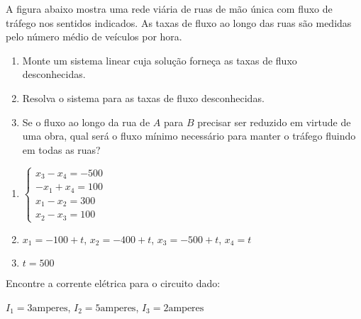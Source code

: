 \documentclass[12pt]{exam}
\begin{document}
\begin{exercicio}
  A figura abaixo mostra uma rede viária de ruas de mão única com fluxo de tráfego nos sentidos indicados. As taxas
  de fluxo ao longo das ruas são medidas pelo número médio de veículos por hora.
  
  

  \begin{enumerate}
    \item Monte um sistema linear cuja solução forneça as taxas de fluxo desconhecidas.
    \item Resolva o sistema para as taxas de fluxo desconhecidas.
    \item Se o fluxo ao longo da rua de $A$ para $B$ precisar ser reduzido em virtude de uma obra, qual será o fluxo mínimo necessário
      para manter o tráfego fluindo em todas as ruas?
  \end{enumerate}
  \begin{solucao}
    \begin{enumerate}
      \item $\begin{cases}x_3 - x_4 = -500\\-x_1 + x_4 = 100\\x_1 - x_2 = 300\\x_2 - x_3 = 100\end{cases}$
      \item $x_1 = -100 +t$, $x_2 = -400 + t$, $x_3 = -500 + t$, $x_4 = t$
      \item $t = 500$
    \end{enumerate}
  \end{solucao}
\end{exercicio}

\begin{exercicio}
  Encontre a corrente elétrica para o circuito dado:
  
  \begin{solucao}
    $I_1 = 3 \mbox{amperes}$,
    $I_2 = 5 \mbox{amperes}$,
    $I_3 = 2 \mbox{amperes}$
  \end{solucao}
\end{exercicio}
\end{document}
